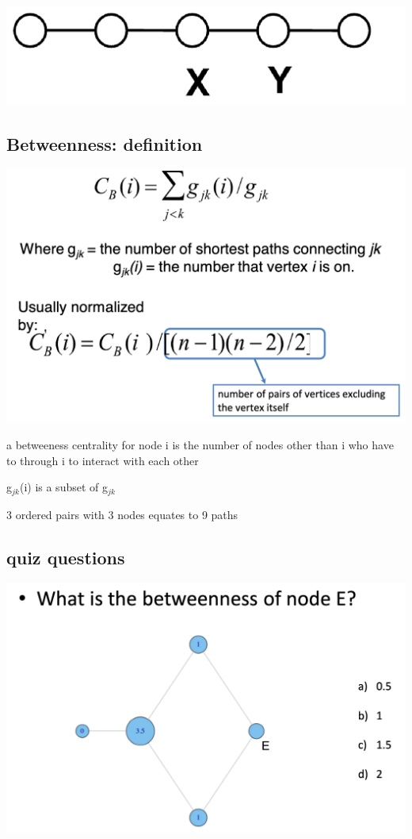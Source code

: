 \documentclass[11pt]{article}
\theoremstyle{definition}
\begin{document}
\includegraphics[width=\textwidth/2]{17.png}

\subsection{Betweenness: definition}
\includegraphics[width=\textwidth/2]{18.png}

a betweeness centrality for node i is the number of nodes
other than i who have to through i to interact with each other

g$_{jk}$(i) is a subset of g$_{jk}$

3 ordered pairs with 3 nodes equates to 9 paths

\subsection{quiz questions}
\includegraphics[width=\textwidth/2]{21.png}
\end{document}
